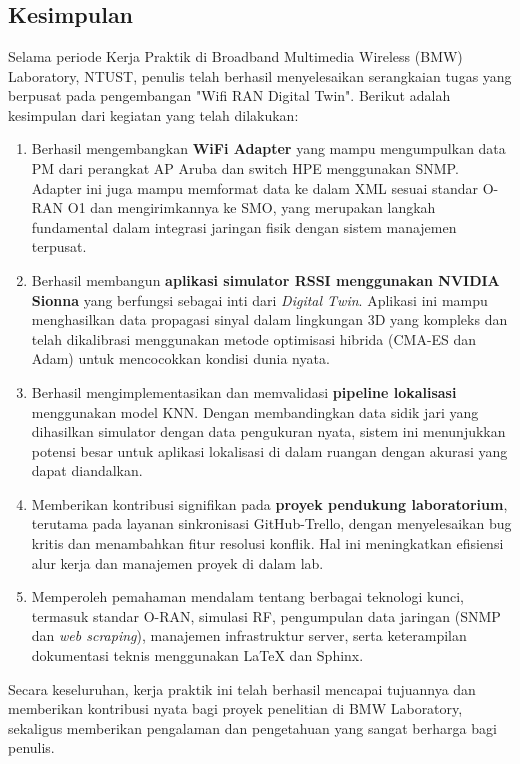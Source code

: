 \chapter{\kesimpulan}

\section{Kesimpulan}
Selama periode Kerja Praktik di Broadband Multimedia Wireless (BMW) Laboratory, NTUST, penulis telah berhasil menyelesaikan serangkaian tugas yang berpusat pada pengembangan "Wifi RAN Digital Twin". Berikut adalah kesimpulan dari kegiatan yang telah dilakukan:
\begin{enumerate}
    \item Berhasil mengembangkan \textbf{WiFi Adapter} yang mampu mengumpulkan data PM dari perangkat AP Aruba dan switch HPE menggunakan SNMP. Adapter ini juga mampu memformat data ke dalam XML sesuai standar O-RAN O1 dan mengirimkannya ke SMO, yang merupakan langkah fundamental dalam integrasi jaringan fisik dengan sistem manajemen terpusat.
    \item Berhasil membangun \textbf{aplikasi simulator RSSI menggunakan NVIDIA Sionna} yang berfungsi sebagai inti dari \textit{Digital Twin}. Aplikasi ini mampu menghasilkan data propagasi sinyal dalam lingkungan 3D yang kompleks dan telah dikalibrasi menggunakan metode optimisasi hibrida (CMA-ES dan Adam) untuk mencocokkan kondisi dunia nyata.
    \item Berhasil mengimplementasikan dan memvalidasi \textbf{pipeline lokalisasi} menggunakan model KNN. Dengan membandingkan data sidik jari yang dihasilkan simulator dengan data pengukuran nyata, sistem ini menunjukkan potensi besar untuk aplikasi lokalisasi di dalam ruangan dengan akurasi yang dapat diandalkan.
    \item Memberikan kontribusi signifikan pada \textbf{proyek pendukung laboratorium}, terutama pada layanan sinkronisasi GitHub-Trello, dengan menyelesaikan bug kritis dan menambahkan fitur resolusi konflik. Hal ini meningkatkan efisiensi alur kerja dan manajemen proyek di dalam lab.
    \item Memperoleh pemahaman mendalam tentang berbagai teknologi kunci, termasuk standar O-RAN, simulasi RF, pengumpulan data jaringan (SNMP dan \textit{web scraping}), manajemen infrastruktur server, serta keterampilan dokumentasi teknis menggunakan LaTeX dan Sphinx.
\end{enumerate}
Secara keseluruhan, kerja praktik ini telah berhasil mencapai tujuannya dan memberikan kontribusi nyata bagi proyek penelitian di BMW Laboratory, sekaligus memberikan pengalaman dan pengetahuan yang sangat berharga bagi penulis.

